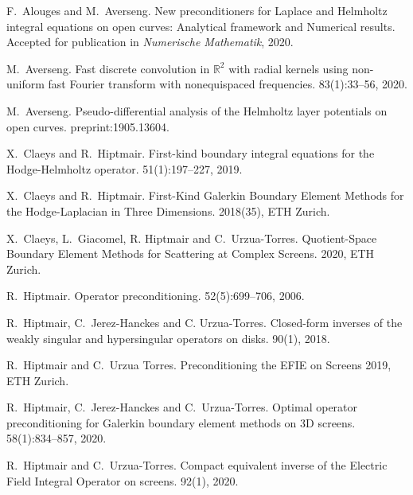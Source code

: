 \documentclass[]{report}
\begin{document}
\begin{thebibliography}{}
	F.~Alouges and M.~Averseng.
	\newblock New preconditioners for Laplace and Helmholtz integral equations on open curves: Analytical framework and Numerical results. 
	\newblock Accepted for publication in {\em Numerische Mathematik}, 2020.
	
	M.~Averseng.
	\newblock Fast discrete convolution in $\mathbb {R}^{2} $ with radial kernels using non-uniform fast Fourier transform with nonequispaced frequencies. 
	 83(1):33--56, 2020.
	
	M.~Averseng. 
	\newblock Pseudo-differential analysis of the Helmholtz layer potentials on open curves. 
	 preprint:1905.13604.
	
	X.~Claeys and R.~Hiptmair.
	\newblock First-kind boundary integral equations for the {H}odge-{H}elmholtz operator.
	 51(1):197--227, 2019.
	
	X.~Claeys and R.~Hiptmair.
	\newblock First-Kind Galerkin Boundary Element Methods for the {H}odge-{L}aplacian in Three Dimensions.
	 2018(35), ETH Zurich.
	
	X.~Claeys, L.~Giacomel, R. Hiptmair and C.~Urzua-Torres.
	\newblock Quotient-Space Boundary Element Methods for Scattering at Complex Screens.
	 2020, ETH Zurich.
	
	
	R.~Hiptmair.
	\newblock Operator preconditioning.
	 52(5):699--706, 2006.
	
	
	R.~Hiptmair, C.~Jerez-Hanckes and C. Urzua-Torres.
	\newblock Closed-form inverses of the weakly singular and hypersingular operators on disks.
	 90(1), 2018.
	
	R.~Hiptmair and C.~Urzua Torres.
	Preconditioning the EFIE on Screens
	 2019, ETH Zurich.
	

	R.~Hiptmair, C.~Jerez-Hanckes and C.~Urzua-Torres.
	\newblock Optimal operator preconditioning for Galerkin boundary element methods on 3D screens. 
	 58(1):834--857, 2020.
	
	R.~Hiptmair and C.~Urzua-Torres.
	\newblock Compact equivalent inverse of the {E}lectric {F}ield
	{I}ntegral {O}perator on screens.
	 92(1), 2020.
	
\end{thebibliography}
\end{document}
